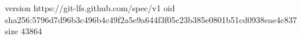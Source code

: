 version https://git-lfs.github.com/spec/v1
oid sha256:5796d7d96b3c496b4c49f2a5e9a644f3f05c23b385e0801b51cd0938eae4c837
size 43864
